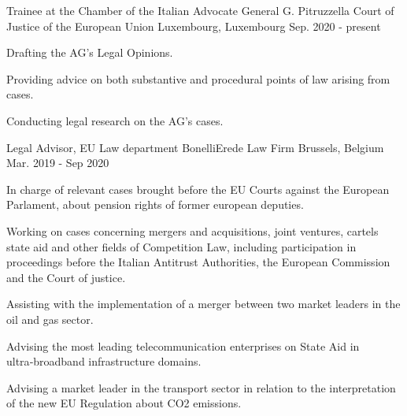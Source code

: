 

\begin{cventries}

   \cventry
    {Trainee at the Chamber of the Italian Advocate General G. Pitruzzella} %
    {Court of Justice of the European Union } %
    {Luxembourg,  Luxembourg} %
    {Sep. 2020 - present} %
    {
      \begin{cvitems} %
      \item {Drafting the AG's Legal Opinions.}
      \item {Providing advice on both substantive and procedural points of law arising from cases.}
        \item {Conducting legal research on the AG's cases.} 
      \end{cvitems}
    }
    
  \cventry
    {Legal Advisor, EU Law department} %
    {BonelliErede Law Firm} %
    {Brussels, Belgium} %
    {Mar. 2019 - Sep 2020} %
    {
      \begin{cvitems} %
          \item {In charge of relevant cases brought before the EU Courts against the European Parlament, about pension rights of former european deputies.}
          \item {Working on cases concerning mergers and acquisitions, joint ventures, cartels state aid and other fields of Competition Law, including participation in proceedings before the Italian Antitrust Authorities, the European Commission and the Court of justice.}
        \item {Assisting with the implementation of a merger between two market leaders in the oil and gas sector.}
        \item {Advising the most leading telecommunication enterprises on State Aid in ultra‑broadband infrastructure domains.}
        \item {Advising a market leader in the transport sector in relation to the interpretation of the new EU Regulation about CO2 emissions.}
      \end{cvitems}
    }
    


\end{cventries}
